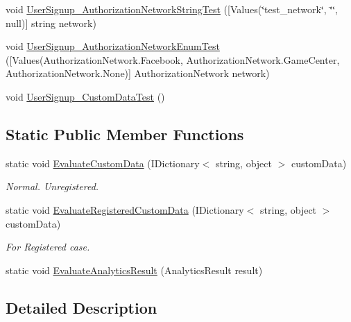 \begin{DoxyCompactItemize}
\item 
void \mbox{\hyperlink{class_unity_engine_1_1_analytics_1_1_tests_1_1_analytics_event_tests_a22a5c01209700653d2f41d990cd9d1af}{User\+Signup\+\_\+\+Authorization\+Network\+String\+Test}} (\mbox{[}Values(\char`\"{}test\+\_\+network\char`\"{}, \char`\"{}\char`\"{}, null)\mbox{]} string network)
\item 
void \mbox{\hyperlink{class_unity_engine_1_1_analytics_1_1_tests_1_1_analytics_event_tests_ab6c09e39ac9ff8131bb041f3f7a40539}{User\+Signup\+\_\+\+Authorization\+Network\+Enum\+Test}} (\mbox{[}Values(Authorization\+Network.\+Facebook, Authorization\+Network.\+Game\+Center, Authorization\+Network.\+None)\mbox{]} Authorization\+Network network)
\item 
void \mbox{\hyperlink{class_unity_engine_1_1_analytics_1_1_tests_1_1_analytics_event_tests_a9c88c81f69bb27cae09d08ef97c9a1b2}{User\+Signup\+\_\+\+Custom\+Data\+Test}} ()
\end{DoxyCompactItemize}
\subsection*{Static Public Member Functions}
\begin{DoxyCompactItemize}
\item 
static void \mbox{\hyperlink{class_unity_engine_1_1_analytics_1_1_tests_1_1_analytics_event_tests_addfce5dc50d03ecdb8b9791b06450b2b}{Evaluate\+Custom\+Data}} (I\+Dictionary$<$ string, object $>$ custom\+Data)
\begin{DoxyCompactList}\small\item\em Normal. Unregistered. \end{DoxyCompactList}\item 
static void \mbox{\hyperlink{class_unity_engine_1_1_analytics_1_1_tests_1_1_analytics_event_tests_a8815a2181a2c1701bb2fee08d3345708}{Evaluate\+Registered\+Custom\+Data}} (I\+Dictionary$<$ string, object $>$ custom\+Data)
\begin{DoxyCompactList}\small\item\em For Registered case. \end{DoxyCompactList}\item 
static void \mbox{\hyperlink{class_unity_engine_1_1_analytics_1_1_tests_1_1_analytics_event_tests_a423dd55d4efe58ed4e98fba55f4bc4fb}{Evaluate\+Analytics\+Result}} (Analytics\+Result result)
\end{DoxyCompactItemize}


\subsection{Detailed Description}


